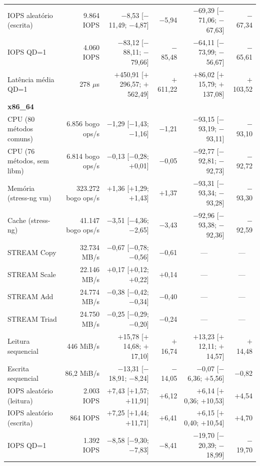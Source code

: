 \begin{table}[htbp]
\begin{threeparttable}
\begin{tabular}{lrrrrr}
IOPS aleatório (escrita) & 9.864 IOPS & $-$8,53 [$-$11,49; $-$4,87] & $-$5,94 & $-$69,39 [$-$71,06; $-$67,63] & $-$67,34 \\
IOPS QD=1\tnote{c} & 4.060 IOPS & $-$83,12 [$-$88,11; $-$79,66] & $-$85,48 & $-$64,11 [$-$73,99; $-$56,67] & $-$65,61 \\
Latência média QD=1\tnote{d} & 278 $\mu$s & $+$450,91 [$+$296,57; $+$562,49] & $+$611,22 & $+$86,02 [$+$15,79; $+$137,08] & $+$103,52 \\
\midrule
\multicolumn{6}{l}{\textbf{x86\_64}} \\
CPU (80 métodos comuns) & 6.856 bogo ops/s & $-$1,29 [$-$1,43; $-$1,16] & $-$1,21 & $-$93,15 [$-$93,19; $-$93,11] & $-$93,10 \\
CPU (76 métodos, sem libm)\tnote{a} & 6.814 bogo ops/s & $-$0,13 [$-$0,28; $+$0,01] & $-$0,05 & $-$92,77 [$-$92,81; $-$92,73] & $-$92,72 \\
Memória (stress-ng vm) & 323.272 bogo ops/s & $+$1,36 [$+$1,29; $+$1,43] & $+$1,37 & $-$93,31 [$-$93,34; $-$93,28] & $-$93,30 \\
Cache (stress-ng) & 41.147 bogo ops/s & $-$3,51 [$-$4,36; $-$2,65] & $-$3,43 & $-$92,96 [$-$93,38; $-$92,36] & $-$92,59 \\
STREAM Copy & 32.734 MB/s & $-$0,67 [$-$0,78; $-$0,56] & $-$0,61 & \multicolumn{1}{c}{---\tnote{e}} & \multicolumn{1}{c}{---} \\
STREAM Scale & 22.146 MB/s & $+$0,17 [$+$0,12; $+$0,22] & $+$0,14 & \multicolumn{1}{c}{---\tnote{e}} & \multicolumn{1}{c}{---} \\
STREAM Add & 24.774 MB/s & $-$0,38 [$-$0,42; $-$0,34] & $-$0,40 & \multicolumn{1}{c}{---\tnote{e}} & \multicolumn{1}{c}{---} \\
STREAM Triad & 24.750 MB/s & $-$0,25 [$-$0,29; $-$0,20] & $-$0,24 & \multicolumn{1}{c}{---\tnote{e}} & \multicolumn{1}{c}{---} \\
Leitura sequencial & 446 MiB/s & $+$15,78 [$+$14,68; $+$17,10] & $+$16,74 & $+$13,23 [$+$12,11; $+$14,57] & $+$14,48 \\
Escrita sequencial & 86,2 MiB/s & $-$13,31 [$-$18,91; $-$8,24] & $-$14,05 & $-$0,07 [$-$6,36; $+$5,56] & $-$0,82 \\
IOPS aleatório (leitura) & 2.003 IOPS & $+$7,43 [$+$1,57; $+$11,91] & $+$6,12 & $+$6,14 [$+$0,36; $+$10,53] & $+$4,54 \\
IOPS aleatório (escrita) & 864 IOPS & $+$7,25 [$+$1,44; $+$11,71] & $+$6,41 & $+$6,15 [$+$0,40; $+$10,54] & $+$4,70 \\
IOPS QD=1 & 1.392 IOPS & $-$8,58 [$-$9,30; $-$7,83] & $-$8,41 & $-$19,70 [$-$20,39; $-$18,99] & $-$19,70 \\

\end{tabular}
\end{threeparttable}
\end{table}
